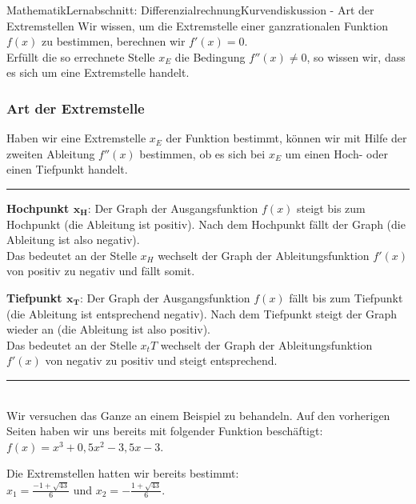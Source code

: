 \documentclass[11pt,twocolumn,oneside,openany,headings=optiontotoc,11pt,numbers=noenddot]{article}
\begin{document}
	\begin{worksheet}{Mathematik}{Lernabschnitt: Differenzialrechnung}{Kurvendiskussion - Art der Extremstellen}
		\setcounter{section}{7}
		\setcounter{subsection}{4}
		\noindent
		Wir wissen, um die Extremstelle einer ganzrationalen Funktion \(f(x)\) zu bestimmen, berechnen wir \(f'(x) = 0\).\\
		Erfüllt die so errechnete Stelle \(x_E\) die Bedingung \(f''(x) \neq{} 0\), so wissen wir, dass es sich um eine Extremstelle handelt.
		\subsubsection{Art der Extremstelle}
		Haben wir eine Extremstelle \(x_E\) der Funktion bestimmt, können wir mit Hilfe der zweiten Ableitung \(f''(x)\) bestimmen, ob es sich bei \(x_E\) um einen Hoch- oder einen Tiefpunkt handelt.\\
		\rule{0.48\textwidth}{0.1pt}
		\begin{framed}
			\noindent
			\textbf{Hochpunkt \(\mathbf{x_H}\)}: Der Graph der Ausgangsfunktion \(f(x)\) steigt bis zum Hochpunkt (die Ableitung ist positiv). Nach dem Hochpunkt fällt der Graph (die Ableitung ist also negativ).\\
			Das bedeutet an der Stelle \(x_H\) wechselt der Graph der Ableitungsfunktion \(f'(x)\) von positiv zu negativ und fällt somit.\\
			\par\noindent
			\textbf{Tiefpunkt \(\mathbf{x_T}\)}: Der Graph der Ausgangsfunktion \(f(x)\) fällt bis zum Tiefpunkt (die Ableitung ist entsprechend negativ). Nach dem Tiefpunkt steigt der Graph wieder an (die Ableitung ist also positiv).\\
			Das bedeutet an der Stelle \(x_tT\) wechselt der Graph der Ableitungsfunktion \(f'(x)\) von negativ zu positiv und steigt entsprechend.
		\end{framed}
		\noindent
		\rule{0.48\textwidth}{0.1pt}\\
		\noindent
		Wir versuchen das Ganze an einem Beispiel zu behandeln. Auf den vorherigen Seiten haben wir uns bereits mit folgender Funktion beschäftigt: \(f(x) = x^3 + 0,5x^2 - 3,5x - 3\).\\
		\par\noindent
		Die Extremstellen hatten wir bereits bestimmt:\\
		\(x_1= \frac{-1+\sqrt{43}}{6}\) und \(x_2 = -\frac{1+\sqrt{43}}{6}\).\\
		\par\noindent

\end{worksheet}
\end{document}
